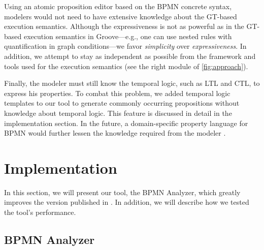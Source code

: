 \documentclass{lmcs} %
\begin{document}

Using an atomic proposition editor based on the BPMN concrete syntax, modelers would not need to have extensive knowledge about the GT-based execution semantics. 
Although the expressiveness is not as powerful as in the GT-based execution semantics in Groove---e.g., one can use nested rules with quantification in graph conditions---we favor \textit{simplicity} over \textit{expressiveness}.
In addition, we attempt to stay as independent as possible from the framework and tools used for the execution semantics (see the right module of \autoref{fig:approach}).

Finally, the modeler must still know the temporal logic, such as LTL and CTL, to express his properties.
To combat this problem, we added temporal logic templates to our tool to generate commonly occurring propositions without knowledge about temporal logic.
This feature is discussed in detail in the implementation section.
In the future, a domain-specific property language for BPMN would further lessen the knowledge required from the modeler \cite{meyersProMoBoxFrameworkGenerating2014}.

\section{Implementation} \label{sec:impl}
In this section, we will present our tool, the BPMN Analyzer, which greatly improves the version published in \cite{krauterFormalizationAnalysisBPMN2023}.
In addition, we will describe how we tested the tool's performance.

\subsection{BPMN Analyzer}
\end{document}
